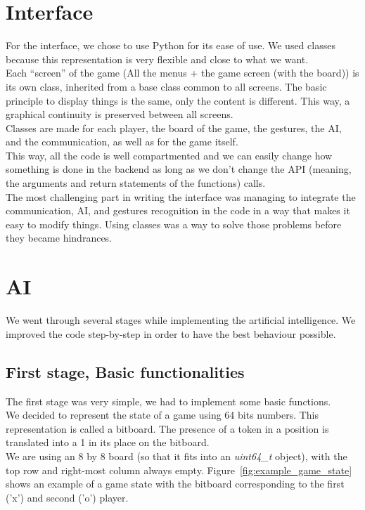 \documentclass[11pt, a4paper, oneside]{report}
\begin{document}
	\section{Interface}
	For the interface, we chose to use Python for its ease of use. We used classes because this representation is very flexible and close to what we want. \\

	Each “screen” of the game (All the menus + the game screen (with the board)) is its own class, inherited from a base class common to all screens. The basic principle to display things is the same, only the content is different. This way, a graphical continuity is preserved between all screens. \\

	Classes are made for each player, the board of the game, the gestures, the AI, and the communication, as well as for the game itself. \\
	This way, all the code is well compartmented and we can easily change how something is done in the backend as long as we don't change the API (meaning, the arguments and return statements of the functions) calls. \\

	The most challenging part in writing the interface was managing to integrate the communication, AI, and gestures recognition in the code in a way that makes it easy to modify things. Using classes was a way to solve those problems before they became hindrances.

	\section{AI}\label{AI_section}

	We went through several stages while implementing the artificial intelligence. We improved the code step-by-step in order to have the best behaviour possible. \\

	\subsection{First stage, Basic functionalities}

	The first stage was very simple, we had to implement some basic functions. \\
	We decided to represent the state of a game using 64 bits numbers. This representation is called a bitboard. The presence of a token in a position is translated into a 1 in its place on the bitboard. \\
	We are using an 8 by 8 board (so that it fits into an \textit{uint64\_t} object), with the top row and right-most column always empty. Figure~\ref{fig:example_game_state} shows an example of a game state with the bitboard corresponding to the first ('x') and second ('o') player.
\end{document}
